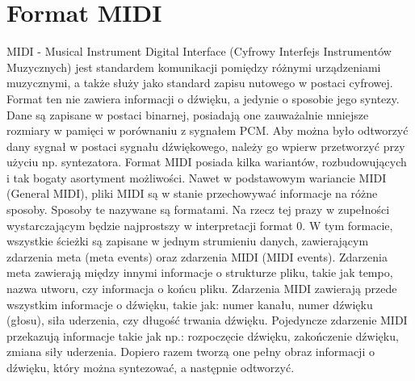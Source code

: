 \section{Format MIDI}
MIDI - Musical Instrument Digital Interface (Cyfrowy Interfejs Instrumentów Muzycznych) jest standardem komunikacji pomiędzy różnymi urządzeniami muzycznymi, a także służy jako standard zapisu nutowego w postaci cyfrowej. Format ten nie zawiera informacji o dźwięku, a jedynie o sposobie jego syntezy. Dane są zapisane w postaci binarnej, posiadają one zauważalnie mniejsze rozmiary w pamięci w porównaniu z sygnałem PCM. Aby można było odtworzyć dany sygnał w postaci sygnału dźwiękowego, należy go wpierw przetworzyć przy użyciu np. syntezatora. Format MIDI posiada kilka wariantów, rozbudowujących i tak bogaty asortyment możliwości. Nawet w podstawowym wariancie MIDI (General MIDI), pliki MIDI są w stanie przechowywać informacje na różne sposoby. Sposoby te nazywane są formatami. Na rzecz tej prazy w zupełności wystarczającym będzie najprostszy w interpretacji format 0. W tym formacie, wszystkie ścieżki są zapisane w jednym strumieniu danych, zawierającym zdarzenia meta (meta events) oraz zdarzenia MIDI (MIDI events). Zdarzenia meta zawierają między innymi informacje o strukturze pliku, takie jak tempo, nazwa utworu, czy informacja o końcu pliku. Zdarzenia MIDI zawierają przede wszystkim informacje o dźwięku, takie jak: numer kanału, numer dźwięku (głosu), siła uderzenia, czy długość trwania dźwięku. Pojedyncze zdarzenie MIDI przekazują informacje takie jak np.: rozpoczęcie dźwięku, zakończenie dźwięku, zmiana siły uderzenia. Dopiero razem tworzą one pełny obraz informacji o dźwięku, który można syntezować, a następnie odtworzyć.




